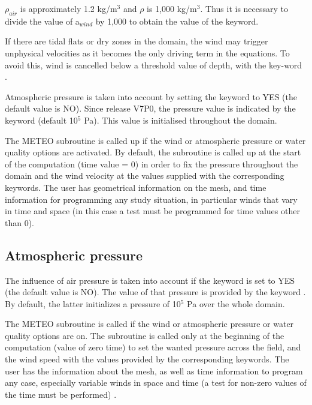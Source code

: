  $\rho_{air}$ is approximately 1.2 kg/m$^3$ and $\rho$ is 1,000 kg/m$^3$. Thus it is necessary to divide the value of a${}_{wind}$ by 1,000 to obtain the value of the  keyword.

 If there are tidal flats or dry zones in the domain, the wind may trigger unphysical velocities as it becomes the only driving term in the equations. To avoid this, wind is cancelled below a threshold value of depth, with the key-word .

 Atmospheric pressure is taken into account by setting the keyword  to YES (the default value is NO). Since release V7P0, the pressure value is indicated by the keyword  (default 10${}^{5}$ Pa). This value is initialised throughout the domain.

 The METEO subroutine is called up if the wind or atmospheric pressure or water quality options are activated. By default, the subroutine is called up at the start of the computation (time value = 0) in order to fix the pressure throughout the domain and the wind velocity at the values supplied with the corresponding keywords. The user has geometrical information on the mesh, and time information for programming any study situation, in particular winds that vary in time and space (in this case a test must be programmed for time values other than 0).


\subsection{ Atmospheric pressure}

 The influence of air pressure is taken into account if the keyword  is set to YES (the default value is NO). The value of that pressure is provided by the keyword . By default, the latter initializes a pressure of 10${}^{5}$ Pa over the whole domain.

 The METEO subroutine is called if the wind or atmospheric pressure or water quality options are on. The subroutine is called only at the beginning of the computation (value of zero time) to set the wanted pressure across the field, and the wind speed with the values {}{}provided by the corresponding keywords. The user has the information about the mesh, as well as time information to program any case, especially variable winds in space and time (a test for non-zero values {}{}of the time must be performed) .

